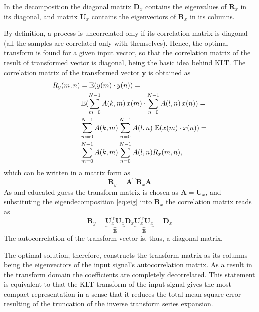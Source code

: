 In the decomposition the diagonal matrix $\mathbf{D}_x $ contains the eigenvalues of $\mathbf{R}_x$ in its diagonal, and matrix $\mathbf{U}_x $ contains the eigenvectors of $\mathbf{R}_x$ in its columns.

\vspace{3mm}
By definition, a process is uncorrelated only if its correlation matrix is diagonal (all the samples are correlated only with themselves).
Hence, the optimal transform is found for a given input vector, so that the correlation matrix of the result of transformed vector is diagonal, being the basic idea behind KLT.
The correlation matrix of the transformed vector $\mathbf{y}$ is obtained as
\begin{align}
\begin{split}
R_y(m,n) &= \operatorname{\mathbb{E}}( y(m) \cdot y(n) ) = \\
&\operatorname{\mathbb{E}}(  \sum_{m=0}^{N-1} A(k,m) \, x(m) \cdot \sum_{n=0}^{N-1} A(l,n) \, x(n)  ) = \\ 
&\sum_{m=0}^{N-1} A(k,m) \sum_{n=0}^{N-1} A(l,n) \, \operatorname{\mathbb{E}}(  x(m) \cdot  x(n)  ) = \\
&\sum_{m=0}^{N-1} A(k,m) \sum_{n=0}^{N-1} A(l,n) R_x(m,n),
\end{split}
\label{eq:eig}
\end{align}
which can be written in a matrix form as
\begin{equation}
\mathbf{R}_y  = \mathbf{A}^{\mathrm{T}} \mathbf{R}_x  \mathbf{A}
\end{equation}
As and educated guess the transform matrix is chosen as $\mathbf{A} = \mathbf{U}_x$, and substituting the eigendecomposition \eqref{eq:eig} into $\mathbf{R}_x$ the correlation matrix reads as
\begin{equation}
\mathbf{R}_y  = \underbrace{\mathbf{U}_x^{\mathrm{T}} \mathbf{U}_x  }_{\mathbf{E}}  \mathbf{D}_x  \underbrace{\mathbf{U}_x ^{\mathrm{T}} \mathbf{U}_x }_{\mathbf{E}}  = \mathbf{D}_x 
\end{equation}
The autocorrelation of the transform vector is, thus, a diagonal matrix.

The optimal solution, therefore, constructs the transform matrix as its columns being the eigenvectors of the input signal's autocorrelation matrix.
As a result in the transform domain the coefficients are completely decorrelated.
This statement is equivalent to that the KLT transform of the input signal gives the most compact representation in a sense that it reduces the total mean-square error resulting of the truncation of the inverse transform series expansion.

